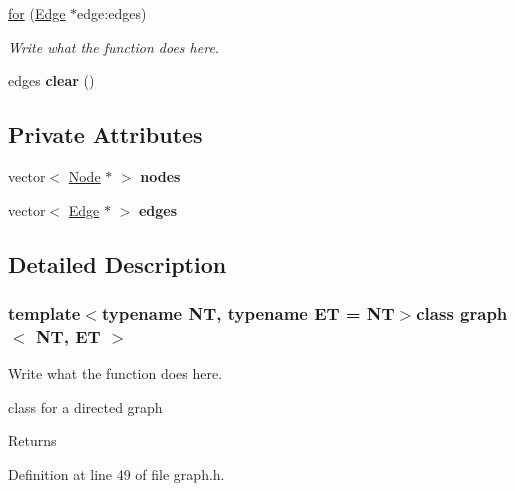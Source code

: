 \begin{DoxyCompactItemize}
\item 
\hyperlink{classgraph_aaef2ed08873bf51b7dd6ee9774abe2be}{for} (\hyperlink{structgraph_1_1Edge}{Edge} $\ast$edge\+:edges)
\begin{DoxyCompactList}\small\item\em Write what the function does here. \end{DoxyCompactList}\item 
\hypertarget{classgraph_a0e2c0bb959508238726edf438402d1b8}{edges {\bfseries clear} ()}\label{classgraph_a0e2c0bb959508238726edf438402d1b8}

\end{DoxyCompactItemize}
\subsection*{Private Attributes}
\begin{DoxyCompactItemize}
\item 
\hypertarget{classgraph_ac106879f6e370243b2413de2a0504da4}{vector$<$ \hyperlink{structgraph_1_1Node}{Node} $\ast$ $>$ {\bfseries nodes}}\label{classgraph_ac106879f6e370243b2413de2a0504da4}

\item 
\hypertarget{classgraph_a52ef68305fa541a124199c0e6283b46d}{vector$<$ \hyperlink{structgraph_1_1Edge}{Edge} $\ast$ $>$ {\bfseries edges}}\label{classgraph_a52ef68305fa541a124199c0e6283b46d}

\end{DoxyCompactItemize}


\subsection{Detailed Description}
\subsubsection*{template$<$typename N\+T, typename E\+T = N\+T$>$class graph$<$ N\+T, E\+T $>$}

Write what the function does here. 

class for a directed graph \begin{DoxyReturn}{Returns}

\end{DoxyReturn}


Definition at line 49 of file graph.\+h.



